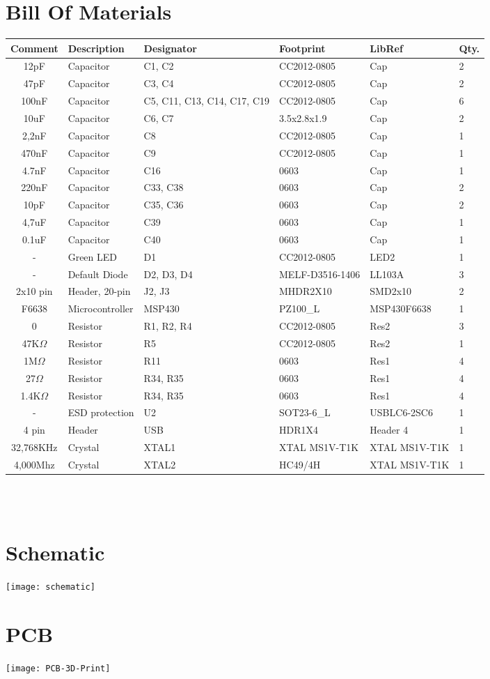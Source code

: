 \section{Bill Of Materials}
{\footnotesize
\begin{tabular}{| c |l | p{1.5cm} | l | l | l |} 
	\hline
		Comment & Description & Designator & Footprint & LibRef & Qty.\\ \hline
		12pF & Capacitor & C1, C2 & CC2012-0805 & Cap & 2\\ \hline
		47pF & Capacitor & C3, C4 & CC2012-0805 & Cap & 2\\ \hline
		100nF & Capacitor & C5, C11, C13, C14, C17, C19 & CC2012-0805 & Cap & 6\\ \hline
		10uF & Capacitor & C6, C7 & 3.5x2.8x1.9 & Cap & 2\\ \hline
		2,2nF & Capacitor & C8 & CC2012-0805 & Cap & 1\\ \hline
		470nF & Capacitor & C9 & CC2012-0805 & Cap & 1\\ \hline
		4.7nF & Capacitor & C16 & 0603 & Cap & 1\\ \hline
		220nF & Capacitor & C33, C38 & 0603 & Cap & 2\\ \hline
		10pF & Capacitor & C35, C36 & 0603 & Cap & 2\\ \hline
		4,7uF & Capacitor & C39 & 0603 & Cap & 1\\ \hline
		0.1uF & Capacitor & C40 & 0603 & Cap & 1\\ \hline
		- & Green LED & D1 & CC2012-0805 & LED2 & 1\\ \hline
		- & Default Diode & D2, D3, D4 & MELF-D3516-1406 &  LL103A & 3\\ \hline
		2x10 pin & Header, 20-pin & J2, J3 & MHDR2X10 & SMD2x10 & 2\\ \hline
		F6638 & Microcontroller & MSP430 & PZ100\_L & MSP430F6638 & 1\\ \hline
		0 & Resistor & R1, R2, R4 & CC2012-0805 & Res2 & 3\\ \hline
		47K$\Omega$ & Resistor & R5 & CC2012-0805 & Res2 & 1\\ \hline
		1M$\Omega$ & Resistor & R11 & 0603 & Res1 & 4\\ \hline
		27$\Omega$ & Resistor & R34, R35 & 0603 & Res1 & 4\\ \hline
		1.4K$\Omega$ & Resistor & R34, R35 & 0603 & Res1 & 4\\ \hline
		- & ESD protection & U2 & SOT23-6\_L & USBLC6-2SC6 & 1\\ \hline
		4 pin & Header & USB & HDR1X4 & Header 4 & 1\\ \hline
		32,768KHz & Crystal & XTAL1 & XTAL MS1V-T1K & XTAL MS1V-T1K & 1\\ \hline
		4,000Mhz & Crystal	& XTAL2 & HC49/4H & XTAL MS1V-T1K & 1\\ \hline
\end{tabular}\\\\
}

\section{Schematic}
\texttt{[image: schematic]}

\section{PCB}
\texttt{[image: PCB-3D-Print]}
